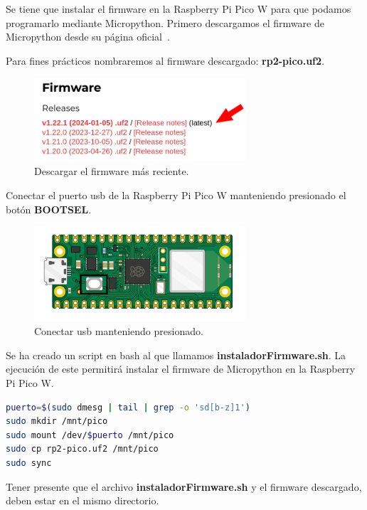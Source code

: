 Se tiene que instalar el firmware en la Raspberry Pi Pico W para que podamos programarlo mediante Micropython.
Primero descargamos el firmware de Micropython desde su página oficial~\cite{misc:MicropythonFirmware}.

Para fines prácticos nombraremos al firmware descargado: \textbf{rp2-pico.uf2}.

\begin{figure}[h]
\centering
\includegraphics[width=0.7\textwidth]{img/herramientas/micropython_firmware.png}
\caption{Descargar el firmware más reciente.}
\end{figure}

Conectar el puerto usb de la Raspberry Pi Pico W manteniendo presionado el botón \textbf{BOOTSEL}.

\begin{figure}[h]
\centering
\includegraphics[width=0.7\textwidth]{img/herramientas/rpipicow_boton.png}
\caption{Conectar usb manteniendo presionado.}
\end{figure}

Se ha creado un script en bash al que llamamos \textbf{instaladorFirmware.sh}. La ejecución de este permitirá instalar el firmware de Micropython en la Raspberry Pi Pico W.


\begin{lstlisting}[language=sh, firstnumber=0, basicstyle=\normalsize, caption={Script en bash para instalar el firmware Micropython.}] 
puerto=$(sudo dmesg | tail | grep -o 'sd[b-z]1')
sudo mkdir /mnt/pico
sudo mount /dev/$puerto /mnt/pico
sudo cp rp2-pico.uf2 /mnt/pico
sudo sync
\end{lstlisting}

Tener presente que el archivo \textbf{instaladorFirmware.sh} y el firmware descargado, deben estar en el mismo directorio.

